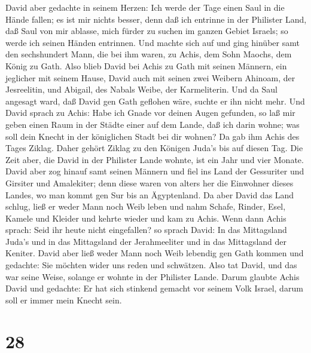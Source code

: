  David aber gedachte in seinem Herzen: Ich werde der Tage
einen Saul in die Hände fallen; es ist mir nichts besser, denn daß ich
entrinne in der Philister Land, daß Saul von mir ablasse, mich fürder zu
suchen im ganzen Gebiet Israels; so werde ich seinen Händen entrinnen.
 Und machte sich auf und ging hinüber samt den sechshundert
Mann, die bei ihm waren, zu Achis, dem Sohn Maochs, dem König zu Gath.
 Also blieb David bei Achis zu Gath mit seinen Männern, ein
jeglicher mit seinem Hause, David auch mit seinen zwei Weibern Ahinoam,
der Jesreelitin, und Abigail, des Nabals Weibe, der Karmeliterin.
 Und da Saul angesagt ward, daß David gen Gath geflohen
wäre, suchte er ihn nicht mehr.  Und David sprach zu Achis:
Habe ich Gnade vor deinen Augen gefunden, so laß mir geben einen Raum in
der Städte einer auf dem Lande, daß ich darin wohne; was soll dein
Knecht in der königlichen Stadt bei dir wohnen?  Da gab ihm
Achis des Tages Ziklag. Daher gehört Ziklag zu den Königen Juda's bis
auf diesen Tag.  Die Zeit aber, die David in der Philister
Lande wohnte, ist ein Jahr und vier Monate.  David aber zog
hinauf samt seinen Männern und fiel ins Land der Gessuriter und Girsiter
und Amalekiter; denn diese waren von alters her die Einwohner dieses
Landes, wo man kommt gen Sur bis an Ägyptenland.  Da aber
David das Land schlug, ließ er weder Mann noch Weib leben und nahm
Schafe, Rinder, Esel, Kamele und Kleider und kehrte wieder und kam zu
Achis.  Wenn dann Achis sprach: Seid ihr heute nicht
eingefallen? so sprach David: In das Mittagsland Juda's und in das
Mittagsland der Jerahmeeliter und in das Mittagsland der Keniter.
 David aber ließ weder Mann noch Weib lebendig gen Gath
kommen und gedachte: Sie möchten wider uns reden und schwätzen. Also tat
David, und das war seine Weise, solange er wohnte in der Philister
Lande.  Darum glaubte Achis David und gedachte: Er hat sich
stinkend gemacht vor seinem Volk Israel, darum soll er immer mein Knecht
sein.

\hypertarget{section-27}{%
\section{28}\label{section-27}}

